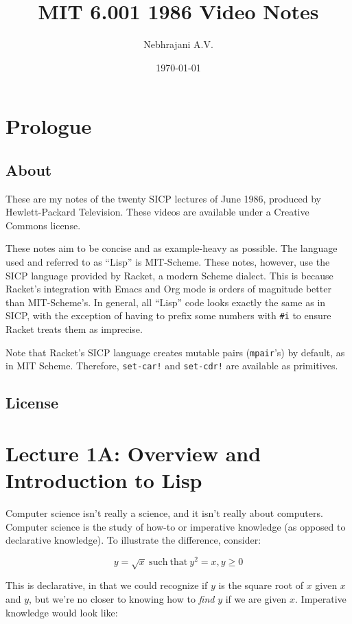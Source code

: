 \documentclass[9pt]{report}
\author{Nebhrajani A.V.}
\date{\today}
\title{MIT 6.001 1986 Video Notes}
\begin{document}
\maketitle
\tableofcontents

\newpage

\chapter{Prologue}
\label{sec:orgca32efa}
\section{About}
\label{sec:org67f1203}
These are my notes of the twenty SICP lectures of June 1986,
produced by Hewlett-Packard Television. These videos are available
under a Creative Commons license.

These notes aim to be concise and as example-heavy as possible. The
language used and referred to as ``Lisp'' is MIT-Scheme. These notes,
however, use the SICP language provided by Racket, a modern Scheme
dialect. This is because Racket's integration with Emacs and Org
mode is orders of magnitude better than MIT-Scheme's. In general,
all ``Lisp'' code looks exactly the same as in SICP, with the
exception of having to prefix some numbers with \texttt{\#i} to ensure
Racket treats them as imprecise.

Note that Racket's SICP language creates mutable pairs (\texttt{mpair}'s)
by default, as in MIT Scheme. Therefore, \texttt{set-car!} and \texttt{set-cdr!}
are available as primitives.

\section{License}
\label{sec:org6058d07}
\doclicenseThis

\chapter{Lecture 1A: Overview and Introduction to Lisp}
\label{sec:orga9f72e4}

Computer science isn't really a science, and it isn't really about
computers. Computer science is the study of how-to or imperative
knowledge (as opposed to declarative knowledge). To illustrate the
difference, consider:

$$y = \sqrt{x} \mathrm{~such~that~} y^2=x, y \geq 0$$

This is declarative, in that we could recognize if \(y\) is the square
root of \(x\) given \(x\) and \(y\), but we're no closer to knowing how to
\emph{find} \(y\) if we are given \(x\). Imperative knowledge would look
like:
\end{document}
